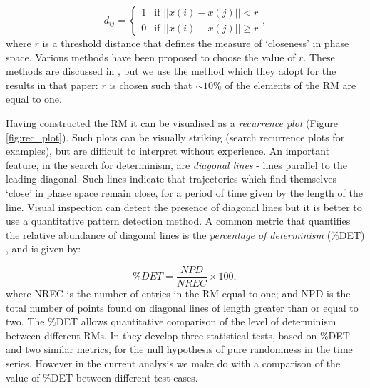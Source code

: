 \begin{equation}
d_{ij} = \begin{cases} 1 &\mbox{if } ||x(i)-x(j)||<r \\
0 & \mbox{if } ||x(i)-x(j)|| \geq r \end{cases},
\label{eq:rm}
\end{equation}
%
where $r$ is a threshold distance that defines the measure of `closeness' in phase space. Various methods have been proposed to choose the value of $r$. These methods are discussed in \cite{aparicio2008detecting}, but we use the method which they adopt for the results in that paper: $r$ is chosen such that $\sim 10\%$ of the elements of the RM are equal to one.

Having constructed the RM it can be visualised as a \emph{recurrence plot} (Figure \ref{fig:rec_plot}). Such plots can be visually striking (search recurrence plots for examples), but are difficult to interpret without experience. An important feature, in the search for determinism, are \emph{diagonal lines} - lines parallel to the leading diagonal. Such lines indicate that trajectories which find themselves `close' in phase space remain close, for a period of time given by the length of the line. Visual inspection can detect the presence of diagonal lines but it is better to use a quantitative pattern detection method. A common metric that quantifies the relative abundance of diagonal lines is the \emph{percentage of determinism} ($\%$DET) \cite{aparicio2008detecting,marwan2007recurrence}, and is given by:

\begin{equation}
\%DET = \frac{NPD}{NREC} \times 100,
\label{eq:pd}
\end{equation}
%
where NREC is the number of entries in the RM equal to one; and NPD is the total number of points found on diagonal lines of length greater than or equal to two. The $\%$DET allows quantitative comparison of the level of determinism between different RMs. In \cite{aparicio2008detecting} they develop three statistical tests, based on $\%$DET and two similar metrics, for the null hypothesis of pure randomness in the time series. However in the current analysis we make do with a comparison of the value of $\%$DET between different test cases.  


